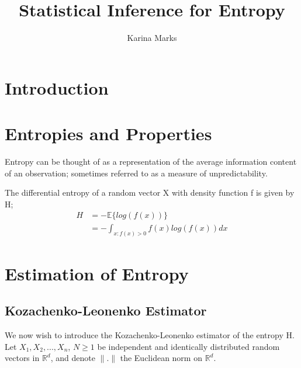 \documentclass{article}
\title{Statistical Inference for Entropy}
\author{Karina Marks}
\begin{document}
\maketitle
\section{Introduction}


\section{Entropies and Properties}
Entropy can be thought of as a representation of the average information content of an observation; sometimes referred to as a measure of unpredictability. 

The differential entropy of a random vector X with density function f is given by H;
\begin{align}
H &= - \mathbb{E} \{log(f(x))\} \\
&= - \int_{x : f(x) > 0} f(x) log(f(x)) dx
\end{align}

\section{Estimation of Entropy}

\subsection{Kozachenko-Leonenko Estimator}

We now wish to introduce the Kozachenko-Leonenko estimator of the entropy H. Let $X_{1}, X_{2}, ... ,X_{n}$, $N \geq 1$ be independent and identically distributed random vectors in $\mathbb{R}^{d}$, and denote $\|.\|$ the Euclidean norm on $\mathbb{R}^{d}$.
 
\end{document}
